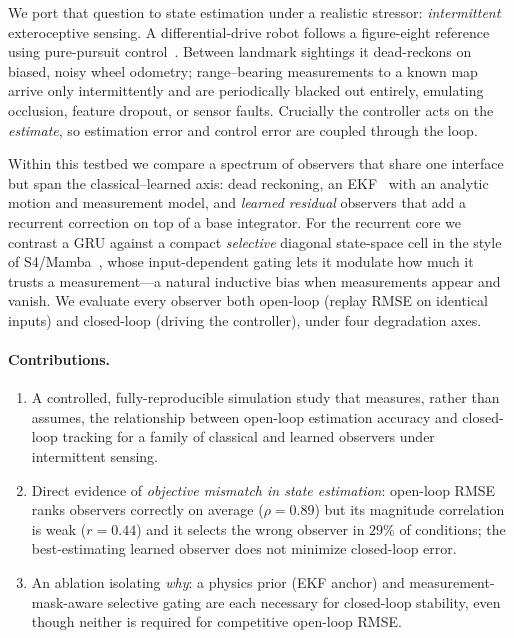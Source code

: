 \documentclass[10pt]{article}
\begin{document}
We port that question to state estimation under a realistic stressor: \emph{intermittent}
exteroceptive sensing. A differential-drive robot follows a figure-eight reference using
pure-pursuit control~\cite{coulter}. Between landmark sightings it dead-reckons on biased,
noisy wheel odometry; range--bearing measurements to a known map arrive only intermittently and
are periodically blacked out entirely, emulating occlusion, feature dropout, or sensor faults.
Crucially the controller acts on the \emph{estimate}, so estimation error and control error are
coupled through the loop.

Within this testbed we compare a spectrum of observers that share one interface but span the
classical--learned axis: dead reckoning, an EKF~\cite{thrun} with an analytic motion and
measurement model, and \emph{learned residual} observers that add a recurrent correction on top of
a base integrator. For the recurrent core we contrast a GRU against a compact \emph{selective}
diagonal state-space cell in the style of S4/Mamba~\cite{s4,mamba}, whose input-dependent gating
lets it modulate how much it trusts a measurement---a natural inductive bias when measurements
appear and vanish. We evaluate every observer both open-loop (replay RMSE on identical inputs) and
closed-loop (driving the controller), under four degradation axes.

\paragraph{Contributions.}
\begin{enumerate}[leftmargin=1.4em,itemsep=1pt,topsep=1pt]
\item A controlled, fully-reproducible simulation study that measures, rather than assumes, the
relationship between open-loop estimation accuracy and closed-loop tracking for a family of
classical and learned observers under intermittent sensing.
\item Direct evidence of \emph{objective mismatch in state estimation}: open-loop RMSE ranks
observers correctly on average ($\rho=0.89$) but its magnitude correlation is weak ($r=0.44$) and
it selects the wrong observer in $29\%$ of conditions; the best-estimating learned observer does
not minimize closed-loop error.
\item An ablation isolating \emph{why}: a physics prior (EKF anchor) and measurement-mask-aware
selective gating are each necessary for closed-loop stability, even though neither is required for
competitive open-loop RMSE.
\end{enumerate}
\end{document}
